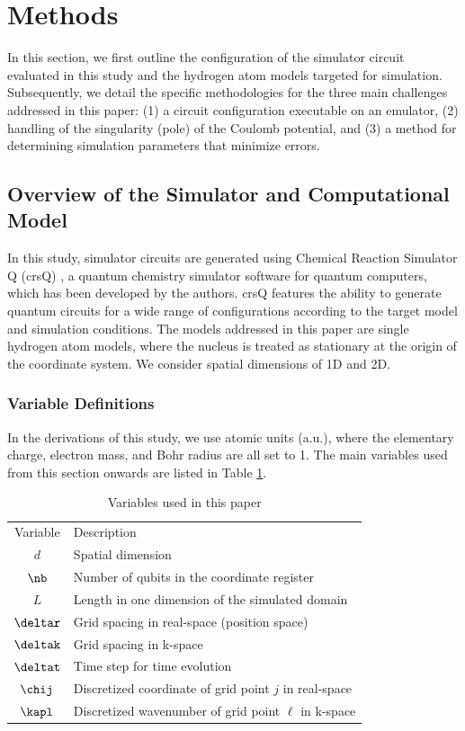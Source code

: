 \documentclass[manuscript_main.tex]{subfiles}
\begin{document}
\section{Methods}
\label{sec:method}
In this section, we first outline the configuration of the simulator circuit
evaluated in this study and the hydrogen atom models targeted for simulation.
Subsequently, we detail the specific methodologies for the three main challenges
addressed in this paper: (1) a circuit configuration executable on an emulator,
(2) handling of the singularity (pole) of the Coulomb potential, and (3) a
method for determining simulation parameters that minimize errors.

\subsection{Overview of the Simulator and Computational Model}
\label{subsec:simulator-model}
In this study, simulator circuits are generated using Chemical Reaction
Simulator Q (crsQ) \cite{website:crsq}, a quantum chemistry simulator software
for quantum computers, which has been developed by the authors. crsQ features
the ability to generate quantum circuits for a wide range of configurations
according to the target model and simulation conditions. The models addressed in
this paper are single hydrogen atom models, where the nucleus is treated as
stationary at the origin of the coordinate system. We consider spatial
dimensions of 1D and 2D.

\subsubsection{Variable Definitions}
In the derivations of this study, we use atomic units (a.u.), where the
elementary charge, electron mass, and Bohr radius are all set to 1. The main
variables used from this section onwards are listed in Table
\ref{tab:variables}.

\begin{table}
    \centering
    \caption{Variables used in this paper}
    \begin{ruledtabular}\begin{tabular}{cl}
        Variable & Description \\
        \colrule
        $d$ & Spatial dimension \\
        $\nb$ & Number of qubits in the coordinate register \\
        $L$ & Length in one dimension of the simulated domain \\
        $\deltar$ & Grid spacing in real-space (position space) \\
        $\deltak$ & Grid spacing in k-space \\
        $\deltat$ & Time step for time evolution \\
        $\chij$ & Discretized coordinate of grid point $j$ in real-space\\
        $\kapl$ & Discretized wavenumber of grid point $\ell$ in k-space
    \end{tabular}\end{ruledtabular}
    \label{tab:variables}
\end{table}
\end{document}
